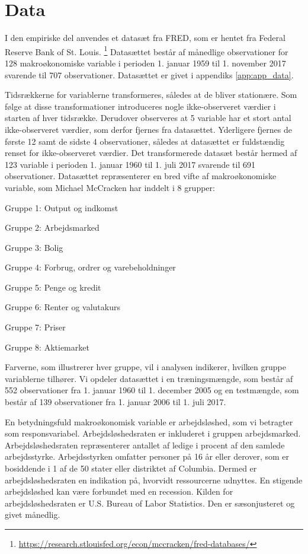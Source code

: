 \chapter{Data} \label{ch:data}
I den empiriske del anvendes et datasæt fra FRED, som er hentet fra Federal Reserve Bank of St. Louis. \footnote{\url{https://research.stlouisfed.org/econ/mccracken/fred-databases/}}
Datasættet består af månedlige observationer for 128 makroøkonomiske variable i perioden 1. januar 1959 til 1. november 2017 svarende til 707 observationer.
Datasættet er givet i appendiks \ref{app:app_data}.

Tidsrækkerne for variablerne transformeres, således at de bliver stationære.
Som følge at disse transformationer introduceres nogle ikke-observeret værdier i starten af hver tidsrække.
Derudover observeres at 5 variable har et stort antal ikke-observeret værdier, som derfor fjernes fra datasættet.
Yderligere fjernes de første 12 samt de sidste 4 observationer, således at datasættet er fuldstændig renset for ikke-observeret værdier.
Det transformerede datasæt består hermed af 123 variable i perioden 1. januar 1960 til 1. juli 2017 svarende til 691 observationer.
Datasættet repræsenterer en bred vifte af makroøkonomiske variable, som Michael McCracken har inddelt i 8 grupper:
%
\begin{description}
\item Gruppe 1: Output og indkomst 
\item Gruppe 2: Arbejdsmarked 
\item Gruppe 3: Bolig 
\item Gruppe 4: Forbrug, ordrer og varebeholdninger  
\item Gruppe 5: Penge og kredit 
\item Gruppe 6: Renter og valutakurs 
\item Gruppe 7: Priser 
\item Gruppe 8: Aktiemarket 
\end{description} 
%
Farverne, som illustrerer hver gruppe, vil i analysen indikerer, hvilken gruppe variablerne tilhører.
Vi opdeler datasættet i en træningsmængde, som består af 552 observationer fra 1. januar 1960 til 1. december 2005 og en testmængde, som består af 139 observationer fra 1. januar 2006 til 1. juli 2017. 

En betydningsfuld makroøkonomisk variable er arbejdsløshed, som vi betragter som responsvariabel.  
Arbejdsløshedsraten er inkluderet i gruppen arbejdsmarked.
Arbejdsløshedsraten repræsenterer antallet af ledige i procent af den samlede arbejdsstyrke.
Arbejdsstyrken omfatter personer på 16 år eller derover, som er bosiddende i 1 af de 50 stater eller distriktet af Columbia.
Dermed er arbejdsløshedsraten en indikation på, hvorvidt ressourcerne udnyttes.
En stigende arbejdsløshed kan være forbundet med en recession.
Kilden for arbejdsløshedsraten er U.S. Bureau of Labor Statistics.
Den er sæsonjusteret og givet månedlig.

